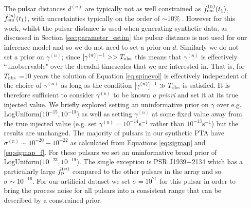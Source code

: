 \documentclass[fleqn,usenatbib,useAMS]{mnras}
\begin{document}
The pulsar distances $d^{(n)}$ are typically not as well constrained as $f_{\rm em}^{(n)} (t_1)$,$\dot{f}_{\rm em}^{(n)} (t_1)$, with uncertainties typically on the order of $\sim 10 \%$ \citep{Arzoumanian2018ApJS..235...37A,Yao2017}. However for this work, whilst the pulsar distance is used when generating synthetic data, as discussed in Section \ref{sec:parameter_estim} the pulsar distance is not used for our inference model and so we do not need to set a prior on $d$. Similarly we do not set a prior on $\gamma^{(n)}$; since $[\gamma^{(n)}]^{-1} >> T_{\rm obs}$ this means that $\gamma^{(n)}$ is effectively ``unobservable" over the decadal timescales that we are interested in. That is, for $T_{\rm obs}$ =10 years the solution of Equation \eqref{eq:spinevol} is effectively independent of the choice of $\gamma^{(n)}$ as long as the condition $[\gamma^{(n)}]^{-1} \gg T_{\rm obs}$ is satisfied. It is therefore sufficient to consider $\gamma^{(n)}$ to be known \textit{a priori} and set it at its true injected value. We briefly explored setting an uninformative prior on $\gamma$ over e.g. LogUniform($10^{-15}, 10^{-10}$) as well as setting $\gamma^{(n)}$ at some fixed value away from the true injected value (e.g. set $\gamma^{(n)} = 10^{-14} \text{s}^{-1}$ rather than $10^{-13} \text{s}^{-1}$) but the results are unchanged. The majority of pulsars in our synthetic PTA have $\sigma^{(n)} \sim 10^{-20} - 10^{-22}$ as calculated from Equations \eqref{eq:sigmap} and \eqref{eq:sigmap_f}. For these pulsars we set an uninformative broad prior of LogUniform($10^{-23}, 10^{-19}$). The single exception is PSR J1939+2134 which has a particularly large $\dot{f}_{\rm p}^{(n)}$ compared to the other pulsars in the array and so $\sigma \sim 10^{-16}$. For our artificial dataset we set $\sigma = 10^{21}$ for this pulsar in order to bring the process noise for all pulsars into a consistent range that can be described by a constrained prior. \newline 
\end{document}
